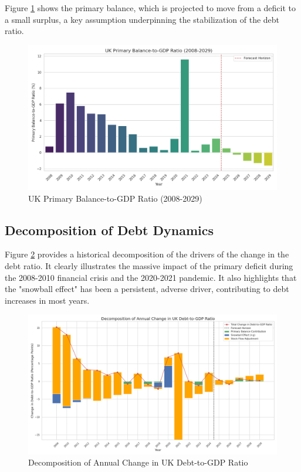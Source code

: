 \documentclass[12pt, a4paper]{article}
\begin{document}
Figure \ref{fig:pb_ratio} shows the primary balance, which is projected to move from a deficit to a small surplus, a key assumption underpinning the stabilization of the debt ratio.

\begin{figure}[h!]
    \centering
    \includegraphics[width=\textwidth]{plots/primary_balance_to_gdp_ratio.png}
    \caption{UK Primary Balance-to-GDP Ratio (2008-2029)}
    \label{fig:pb_ratio}
\end{figure}

\subsection{Decomposition of Debt Dynamics}
Figure \ref{fig:debt_decomp} provides a historical decomposition of the drivers of the change in the debt ratio. It clearly illustrates the massive impact of the primary deficit during the 2008-2010 financial crisis and the 2020-2021 pandemic. It also highlights that the "snowball effect" has been a persistent, adverse driver, contributing to debt increases in most years.

\begin{figure}[h!]
    \centering
    \includegraphics[width=\textwidth]{plots/debt_decomposition.png}
    \caption{Decomposition of Annual Change in UK Debt-to-GDP Ratio}
    \label{fig:debt_decomp}
\end{figure}
\end{document}
